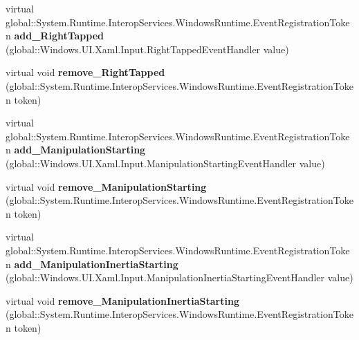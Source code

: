 \begin{DoxyCompactItemize}
virtual global\+::\+System.\+Runtime.\+Interop\+Services.\+Windows\+Runtime.\+Event\+Registration\+Token {\bfseries add\+\_\+\+Right\+Tapped} (global\+::\+Windows.\+U\+I.\+Xaml.\+Input.\+Right\+Tapped\+Event\+Handler value)
\item 
\mbox{\label{class_windows_1_1_u_i_1_1_xaml_1_1_u_i_element_a89eaa447c459a4c2b259272790db23ad}} 
virtual void {\bfseries remove\+\_\+\+Right\+Tapped} (global\+::\+System.\+Runtime.\+Interop\+Services.\+Windows\+Runtime.\+Event\+Registration\+Token token)
\item 
\mbox{\label{class_windows_1_1_u_i_1_1_xaml_1_1_u_i_element_ab2370986b3c9a39fbf279765c5314e6a}} 
virtual global\+::\+System.\+Runtime.\+Interop\+Services.\+Windows\+Runtime.\+Event\+Registration\+Token {\bfseries add\+\_\+\+Manipulation\+Starting} (global\+::\+Windows.\+U\+I.\+Xaml.\+Input.\+Manipulation\+Starting\+Event\+Handler value)
\item 
\mbox{\label{class_windows_1_1_u_i_1_1_xaml_1_1_u_i_element_a6b3fdc2deaa4b4844b6f70ba634a074e}} 
virtual void {\bfseries remove\+\_\+\+Manipulation\+Starting} (global\+::\+System.\+Runtime.\+Interop\+Services.\+Windows\+Runtime.\+Event\+Registration\+Token token)
\item 
\mbox{\label{class_windows_1_1_u_i_1_1_xaml_1_1_u_i_element_a720897f9e46f85c8b896d40d415419c3}} 
virtual global\+::\+System.\+Runtime.\+Interop\+Services.\+Windows\+Runtime.\+Event\+Registration\+Token {\bfseries add\+\_\+\+Manipulation\+Inertia\+Starting} (global\+::\+Windows.\+U\+I.\+Xaml.\+Input.\+Manipulation\+Inertia\+Starting\+Event\+Handler value)
\item 
\mbox{\label{class_windows_1_1_u_i_1_1_xaml_1_1_u_i_element_a70d5f221b113c0f94830ff04ba95e077}} 
virtual void {\bfseries remove\+\_\+\+Manipulation\+Inertia\+Starting} (global\+::\+System.\+Runtime.\+Interop\+Services.\+Windows\+Runtime.\+Event\+Registration\+Token token)
\item 
\mbox{\label{class_windows_1_1_u_i_1_1_xaml_1_1_u_i_element_a267e7d9d4c83d6c6a025e11165660ad9}} 

\end{DoxyCompactItemize}
